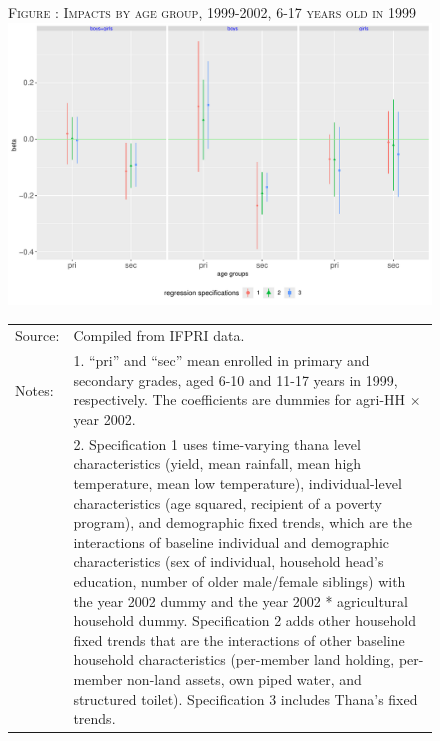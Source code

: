 \documentclass[12pt,letterpaper]{article}
\newcommand{\0}{\ensuremath{\mbox{\boldmath $0$}}}
\begin{document}

\begin{figure}
\hfil\textsc{\footnotesize Figure \thefigure: Impacts by age group, 1999-2002, 6-17 years old in 1999\label{GenderAgeGroup2Impacts}}\\
\hfil \includegraphics[height=.23\paperheight]{Figures/GenderAgeGroup2Impacts.pdf}\\
\renewcommand{\arraystretch}{1}
\hfil\begin{tabular}{>{\hfill\scriptsize}p{1cm}<{}>{\scriptsize}p{11cm}<{\hfill}}
Source: & Compiled from IFPRI data. \\[-1ex]
Notes:& 1. ``pri'' and ``sec'' mean enrolled in primary and secondary grades, aged 6-10 and 11-17 years in 1999, respectively. The coefficients are dummies for agri-HH $\times$ year 2002.\\[-1ex]
& 2. Specification 1 uses time-varying thana level characteristics (yield, mean rainfall, mean high temperature, mean low temperature), individual-level characteristics (age squared, recipient of a poverty program), and \textsf{demographic fixed trends,} which are the interactions of baseline individual and demographic characteristics (sex of individual, household head's education, number of older male/female siblings) with the year 2002 dummy and the year 2002 * agricultural household dummy. Specification 2 adds \textsf{other household fixed trends} that are the interactions of other baseline household characteristics (per-member land holding, per-member non-land assets, own piped water, and structured toilet). Specification 3 includes \textsf{Thana's fixed trends}. \\[-1ex]

\end{tabular}
\end{figure}
\end{document}
